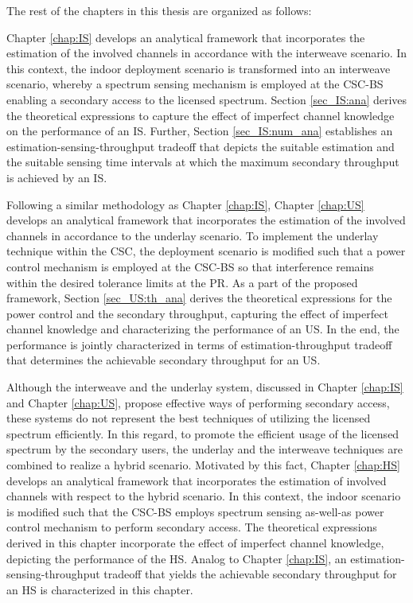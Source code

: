 The rest of the chapters in this thesis are organized as follows:

Chapter \ref{chap:IS} develops an analytical framework that incorporates the estimation of the involved channels in accordance with the interweave scenario. In this context, the indoor deployment scenario is transformed into an interweave scenario, whereby a spectrum sensing mechanism is employed at the CSC-BS enabling a secondary access to the licensed spectrum. Section \ref{sec_IS:ana} derives the theoretical expressions to capture the effect of imperfect channel knowledge on the performance of an IS. Further, Section \ref{sec_IS:num_ana} establishes an estimation-sensing-throughput tradeoff that depicts the suitable estimation and the suitable sensing time intervals at which the maximum secondary throughput is achieved by an IS. 


Following a similar methodology as Chapter \ref{chap:IS}, Chapter \ref{chap:US} develops an analytical framework that incorporates the estimation of the involved channels in accordance to the underlay scenario. To implement the underlay technique within the CSC, the deployment scenario is modified such that a power control mechanism is employed at the CSC-BS so that interference remains within the desired tolerance limits at the PR. As a part of the proposed framework, Section \ref{sec_US:th_ana} derives the theoretical expressions for the power control and the secondary throughput, capturing the effect of imperfect channel knowledge and characterizing the performance of an US. In the end, the performance is jointly characterized in terms of estimation-throughput tradeoff that determines the achievable secondary throughput for an US.  

Although the interweave and the underlay system, discussed in Chapter \ref{chap:IS} and Chapter \ref{chap:US}, propose effective ways of performing secondary access, these systems do not represent the best techniques of utilizing the licensed spectrum efficiently. In this regard, to promote the efficient usage of the licensed spectrum by the secondary users, the underlay and the interweave techniques are combined to realize a hybrid scenario. Motivated by this fact, Chapter \ref{chap:HS} develops an analytical framework that incorporates the estimation of involved channels with respect to the hybrid scenario. In this context, the indoor scenario is modified such that the CSC-BS employs spectrum sensing as-well-as power control mechanism to perform secondary access. The theoretical expressions derived in this chapter incorporate the effect of imperfect channel knowledge, depicting the performance of the HS. Analog to Chapter \ref{chap:IS}, an estimation-sensing-throughput tradeoff that yields the achievable secondary throughput for an HS is characterized in this chapter. 

